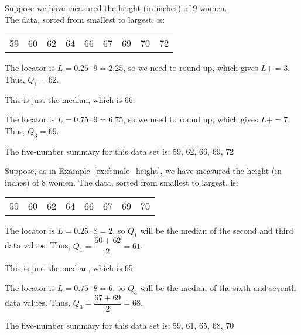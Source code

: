 \documentclass{beamer}
\begin{document}
\begin{frame}
\begin{example}\label{ex:female_height}
Suppose we have measured the height (in inches) of 9 women.\\ The data, sorted from smallest to largest, is:
\begin{center}
\begin{tabular}{ccccccccc}
59 & 60 & 62 & 64 & 66 & 67 & 69 & 70 & 72
\end{tabular}
\end{center}

\onslide<+->
\begin{description}[<+- | alert@+>]
\item[Finding $Q_1$:] The locator is $L=0.25\cdot 9=2.25$, so we need to round up, which gives $L+=3$. Thus, $Q_1=62$.
\item[Finding $Q_2$:] This is just the median, which is 66.
\item[Finding $Q_3$:] The locator is $L=0.75\cdot 9=6.75$, so we need to round up, which gives $L+=7$. Thus, $Q_3=69$.
\end{description}

\onslide<+->
The five-number summary for this data set is: 59, 62, 66, 69, 72
\end{example}
\end{frame}

\begin{frame}
\begin{example}
Suppose, as in Example~\ref{ex:female_height}, we have measured the height (in inches) of 8 women. The data, sorted from smallest to largest, is:
\begin{center}
\begin{tabular}{cccccccc}
59 & 60 & 62 & 64 & 66 & 67 & 69 & 70
\end{tabular}
\end{center}

\onslide<+->
\begin{description}[<+- | alert@+>]
\item[Finding $Q_1$:] The locator is $L=0.25\cdot 8=2$, so $Q_1$ will be the median of the second and third data values. Thus, $Q_1=\dfrac{60+62}{2}=61$.
\item[Finding $Q_2$:] This is just the median, which is 65.
\item[Finding $Q_3$:] The locator is $L=0.75\cdot 8=6$, so $Q_3$ will be the median of the sixth and seventh data values. Thus, $Q_3=\dfrac{67+69}{2}=68$.\end{description}

\onslide<+->
The five-number summary for this data set is: 59, 61, 65, 68, 70
\end{example}
\end{frame}
\end{document}
